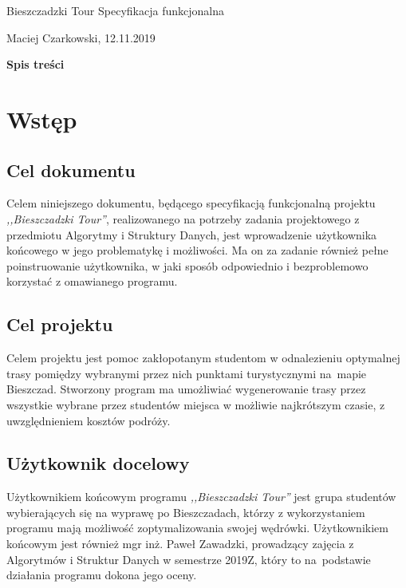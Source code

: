 \documentclass[12pt,a4paper]{article}
\begin{document}
\begin{titlepage}
\vspace*{\fill}
\begin{center}
{\fontsize{50}{0.1}\selectfont Bieszczadzki Tour}
\huge Specyfikacja funkcjonalna
\end{center}
\vspace*{\fill}
\begin{center}
Maciej Czarkowski, 12.11.2019
\end{center}
\end{titlepage}
\clearpage
\hspace{1cm}
\begin{center}
\LARGE\textbf{Spis treści}
\end{center}
\tableofcontents
\clearpage
\section{Wstęp}
\subsection{Cel dokumentu}
Celem niniejszego dokumentu, będącego specyfikacją funkcjonalną projektu \textsl{,,Bieszczadzki Tour''}, realizowanego na potrzeby zadania projektowego z przedmiotu Algorytmy i Struktury Danych, jest wprowadzenie użytkownika końcowego w jego problematykę i możliwości. Ma on za zadanie również pełne poinstruowanie użytkownika, w jaki sposób odpowiednio i bezproblemowo korzystać z omawianego programu.
\subsection{Cel projektu}
Celem projektu jest pomoc zakłopotanym studentom w odnalezieniu optymalnej trasy pomiędzy wybranymi przez nich punktami turystycznymi na~mapie Bieszczad. Stworzony program ma umożliwiać wygenerowanie trasy przez wszystkie wybrane przez studentów miejsca w możliwie najkrótszym czasie, z uwzględnieniem kosztów podróży.
\subsection{Użytkownik docelowy}
Użytkownikiem końcowym programu \textsl{,,Bieszczadzki Tour''} jest grupa studentów wybierających się na wyprawę po Bieszczadach, którzy z wykorzystaniem programu mają możliwość zoptymalizowania swojej wędrówki. Użytkownikiem końcowym jest również mgr inż. Paweł Zawadzki, prowadzący zajęcia z Algorytmów i Struktur Danych w semestrze 2019Z, który to na~podstawie działania programu dokona jego oceny.
\newpage
\end{document}
